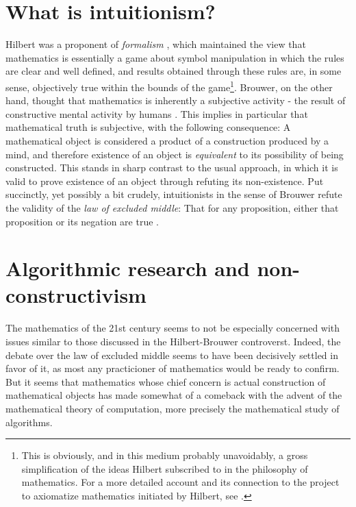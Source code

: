 \section{What is intuitionism?}
Hilbert was a proponent of \emph{formalism} \cite{zachHilbertProgram2019}, which maintained the view that mathematics is essentially a game about symbol manipulation in which the rules are clear and well defined, and results obtained through these rules are, in some sense, objectively true within the bounds of the game\footnote{This is obviously, and in this medium probably unavoidably, a gross simplification of the ideas Hilbert subscribed to in the philosophy of mathematics. For a more detailed account and its connection to the project to axiomatize mathematics initiated by Hilbert, see \cite{zachHilbertProgram2019}.}. Brouwer, on the other hand, thought that mathematics is inherently a subjective activity - the result of constructive mental activity by humans \cite{iemhoffIntuitionismPhilosophyMathematics2020}. This implies in particular that mathematical truth is subjective, with the following consequence: A mathematical object is considered a product of a construction produced by a mind, and therefore existence of an object is \emph{equivalent} to its possibility of being constructed. This stands in sharp contrast to the usual approach, in which it is valid to prove existence of an object through refuting its non-existence. Put succinctly, yet possibly a bit crudely, intuitionists in the sense of Brouwer refute the validity of the \emph{law of excluded middle}: That for any proposition, either that proposition or its negation are true \cite{iemhoffIntuitionismPhilosophyMathematics2020}.

\section{Algorithmic research and non-constructivism}
The mathematics of the 21st century seems to not be especially concerned with issues similar to those discussed in the Hilbert-Brouwer controverst. Indeed, the debate over the law of excluded middle seems to have been decisively settled in favor of it, as most any practicioner of mathematics would be ready to confirm. But it seems that mathematics whose chief concern is actual construction of mathematical objects has made somewhat of a comeback with the advent of the mathematical theory of computation, more precisely the mathematical study of algorithms.

